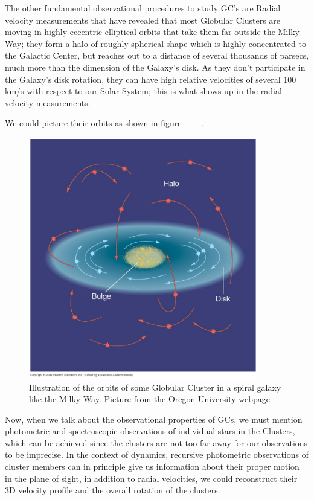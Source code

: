 The other fundamental observational procedures to study GC's are Radial velocity measurements that have revealed that most Globular Clusters are moving in highly eccentric elliptical orbits that take them far outside the Milky Way; they form a halo of roughly spherical shape which is highly concentrated to the Galactic Center, but reaches out to a distance of several thousands of parsecs, much more than the dimension of the Galaxy's disk. As they don't participate in the Galaxy's disk rotation, they can have high relative velocities of several 100 km/s with respect to our Solar System; this is what shows up in the radial velocity measurements. 

We could picture their orbits as shown in figure ------.

\begin{figure}[H]
\centering
\includegraphics[width=10cm]{images/orbits_gcs.jpg}
\caption[Illustration of the orbits of Globular Clusters around a spiral galaxy]{Illustration of the orbits of some Globular Cluster in a spiral galaxy like the Milky Way. Picture from the Oregon University webpage}
\end{figure}

Now, when we talk about the observational properties of GCs, we must mention photometric and spectroscopic observations of individual stars in the Clusters, which can be achieved since the clusters are not too far away for our observations to be imprecise. In the context of dynamics, recursive photometric observations of cluster members can in principle give us information about their proper motion in the plane of sight, in addition to radial velocities, we could reconstruct their 3D velocity profile and the overall rotation of the clusters. 

